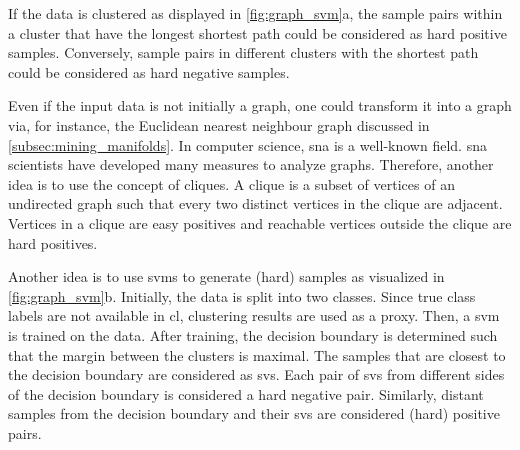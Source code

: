 If the data is clustered as displayed in \autoref{fig:graph_svm}a,
the sample pairs within a cluster that have the longest shortest path could be considered as hard positive samples.
Conversely, sample pairs in different clusters with the shortest path could be considered as hard negative samples.


Even if the input data is not initially a graph, one could transform it into a graph via, for instance, 
the Euclidean nearest neighbour graph discussed in \autoref{subsec:mining_manifolds}.
In computer science, \ac{sna} is a well-known field.
\ac{sna} scientists have developed many measures to analyze graphs.
Therefore, another idea is to use the concept of cliques.
A clique is a subset of vertices of an undirected graph such that every two distinct vertices in the clique are adjacent.
Vertices in a clique are easy positives and reachable vertices outside the clique are hard positives.

Another idea is to use \acfp{svm} to generate (hard) samples as visualized in \autoref{fig:graph_svm}b.
Initially, the data is split into two classes. 
Since true class labels are not available in \ac{cl}, clustering results are used as a proxy.
Then, a \ac{svm} is trained on the data.
After training, the decision boundary is determined such that 
the margin between the clusters is maximal.
The samples that are closest to the decision boundary are considered as \acfp{sv}.
Each pair of \acp{sv} from different sides of the decision boundary is considered a hard negative pair.
Similarly, distant samples from the decision boundary and their \acp{sv} are considered (hard) positive pairs.

